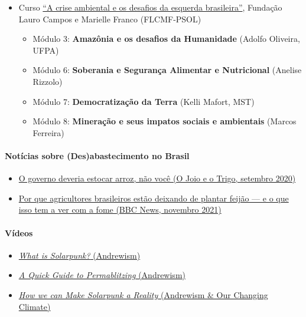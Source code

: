 \begin{itemize}
\tightlist
\item
  Curso
  \href{https://plataforma.laurocampos.org.br/cursos/crise-ambiental/}{``A
  crise ambiental e os desafios da esquerda brasileira''}, Fundação
  Lauro Campos e Marielle Franco (FLCMF-PSOL)

  \begin{itemize}
  \tightlist
  \item
    Módulo 3: \textbf{Amazônia e os desafios da Humanidade} (Adolfo
    Oliveira, UFPA)
  \item
    Módulo 6: \textbf{Soberania e Segurança Alimentar e Nutricional}
    (Anelise Rizzolo)
  \item
    Módulo 7: \textbf{Democratização da Terra} (Kelli Mafort, MST)
  \item
    Módulo 8: \textbf{Mineração e seus impatos sociais e ambientais}
    (Marcos Ferreira)
  \end{itemize}
\end{itemize}

\hypertarget{notuxedcias-sobre-desabastecimento-no-brasil}{%
\paragraph{Notícias sobre (Des)abastecimento no
Brasil}\label{notuxedcias-sobre-desabastecimento-no-brasil}}

\begin{itemize}
\tightlist
\item
  \href{https://ojoioeotrigo.com.br/2020/09/o-governo-deveria-estocar-arroz-nao-voce/}{O
  governo deveria estocar arroz, não você (O Joio e o Trigo, setembro
  2020)}
\item
  \href{https://www.bbc.com/portuguese/brasil-59070059}{Por que
  agricultores brasileiros estão deixando de plantar feijão --- e o que
  isso tem a ver com a fome (BBC News, novembro 2021)}
\end{itemize}

\hypertarget{vuxeddeos}{%
\paragraph{Vídeos}\label{vuxeddeos}}

\begin{itemize}
\tightlist
\item
  \href{https://www.youtube.com/watch?v=hHI61GHNGJM}{\textit{What is Solarpunk?}
  (Andrewism)}
\item
  \href{https://www.youtube.com/watch?v=lFDm7JLze5g}{\textit{A Quick Guide to Permablitzing}
  (Andrewism)}
\item
  \href{https://www.youtube.com/watch?v=u-JvyfZVkIM}{\textit{How we can Make Solarpunk a Reality}
  (Andrewism \& Our Changing Climate)}
\end{itemize}
